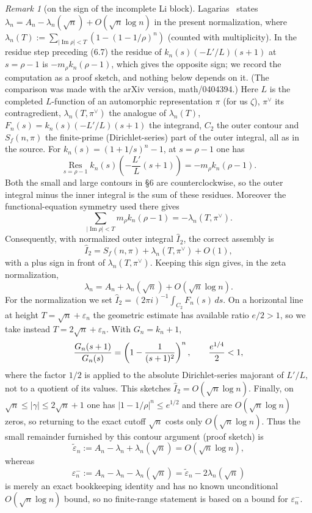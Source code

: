 \documentclass[11pt]{amsart}
\theoremstyle{definition}
\theoremstyle{remark}
\newtheorem{remark}[theorem]{Remark}
\theoremstyle{definition}
\renewcommand{\Im}{\operatorname{Im}}
\begin{document}
\begin{remark}[on the sign of the incomplete Li block]\label{rmk:lagarias-sign-erratum}
Lagarias~\cite[Theorem 1.1, (1.17); Theorem 6.1, (6.2); (6.7)]{Lagarias2007} states
$\lambda_n=A_n-\lambda_n(\sqrt n)+O(\sqrt n\log n)$ in the present normalization, where
$\lambda_n(T):=\sum_{|\Im\rho|<T}(1-(1-1/\rho)^n)$ (counted with multiplicity).  In the residue step
preceding (6.7) the residue of $k_n(s)(-L'/L)(s+1)$ at $s=\rho-1$ is $-m_\rho k_n(\rho-1)$, which gives
the opposite sign; we record the computation as a proof sketch, and nothing below depends on it.  (The
comparison was made with the arXiv version, math/0404394.)  Here $L$ is the completed $L$-function
of an automorphic representation $\pi$ (for us $\zeta$), $\pi^\vee$ its contragredient,
$\lambda_n(T,\pi^\vee)$ the analogue of $\lambda_n(T)$, $F_n(s)=k_n(s)(-L'/L)(s+1)$ the integrand,
$C_2$ the outer contour and $S_f(n,\pi)$ the finite-prime (Dirichlet-series) part of the outer
integral, all as in the source.  For
$k_n(s)=(1+1/s)^n-1$, at $s=\rho-1$ one has
\[
\operatorname*{Res}_{s=\rho-1}
 k_n(s)\left(-\frac{L'}L(s+1)\right)=-m_\rho k_n(\rho-1).
\]
Both the small and large contours in \S6 are counterclockwise, so the outer
integral minus the inner integral is the sum of these residues.  Moreover the
functional-equation symmetry used there gives
\[
 \sum_{|\Im\rho|<T}m_\rho k_n(\rho-1)=-\lambda_n(T,\pi^\vee).
\]
Consequently, with normalized outer integral \(\widehat I_2\), the correct
assembly is
\[
 \widehat I_2=S_f(n,\pi)+\lambda_n(T,\pi^\vee)+O(1),
\]
with a plus sign in front of $\lambda_n(T,\pi^\vee)$.  Keeping this sign gives, in the zeta normalization,
\[
 \lambda_n=A_n+\lambda_n(\sqrt n)+O(\sqrt n\log n).
\]
For the normalization we set
$\widehat I_2=(2\pi i)^{-1}\int_{C_2}F_n(s)\,ds$.  On a horizontal line at height
$T=\sqrt n+\varepsilon_n$ the geometric estimate has available ratio $e/2>1$, so we take instead
$T=2\sqrt n+\varepsilon_n$.  With $G_n=k_n+1$,
\[
 {G_n(s+1)\over G_n(s)}=\left(1-{1\over(s+1)^2}\right)^n,
 \qquad {e^{1/4}\over2}<1,
\]
where the factor $1/2$ is applied to the absolute Dirichlet-series majorant of $L'/L$, not to a
quotient of its values.  This sketches $\widehat I_2=O(\sqrt n\log n)$.  Finally, on
$\sqrt n\le|\gamma|\le2\sqrt n+1$ one has
$|1-1/\rho|^n\le e^{1/2}$ and there are $O(\sqrt n\log n)$ zeros, so returning to the exact cutoff
$\sqrt n$ costs only $O(\sqrt n\log n)$.
Thus the small remainder furnished by this contour argument (proof sketch) is
\[
 \widetilde\varepsilon_n:=A_n-\lambda_n+\lambda_n(\sqrt n)
       =O(\sqrt n\log n),                                  \tag{L$'$}
\]
whereas
\[
 \varepsilon_n^-:=A_n-\lambda_n-\lambda_n(\sqrt n)
 =\widetilde\varepsilon_n-2\lambda_n(\sqrt n)
\]
is merely an exact bookkeeping identity and has no known unconditional
$O(\sqrt n\log n)$ bound, so no finite-range statement is based on a bound for $\varepsilon_n^-$.


\end{remark}
\end{document}
